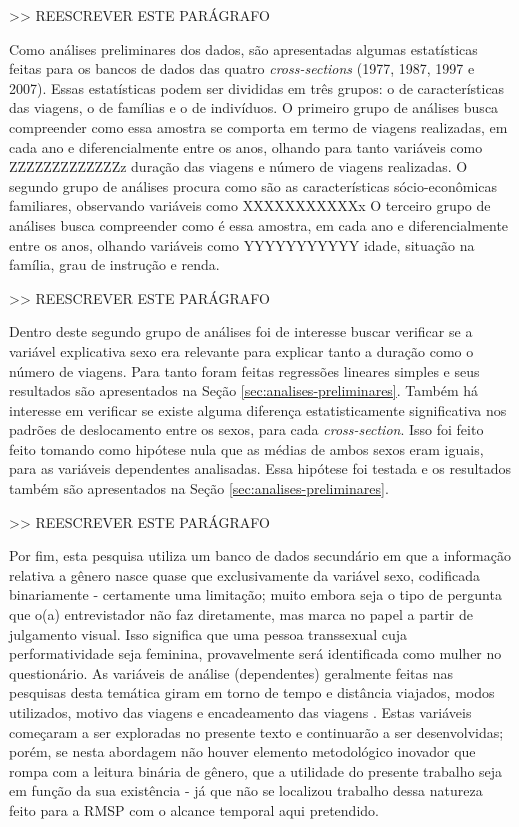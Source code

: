 >> REESCREVER ESTE PARÁGRAFO

Como análises preliminares dos dados, são apresentadas algumas estatísticas feitas para os bancos de dados das quatro \emph{cross-sections} (1977, 1987, 1997 e 2007). Essas estatísticas podem ser divididas em três grupos: o de características das viagens, o de famílias e o de indivíduos. 
O primeiro grupo de análises busca compreender como essa amostra se comporta em termo de viagens realizadas, em cada ano e diferencialmente entre os anos, olhando para tanto variáveis como 
ZZZZZZZZZZZZZz duração das viagens e número de viagens realizadas.
O segundo grupo de análises procura como são as características sócio-econômicas familiares, observando variáveis como 
XXXXXXXXXXXx
O terceiro grupo de análises busca compreender como é essa amostra, em cada ano e diferencialmente entre os anos, olhando variáveis como 
YYYYYYYYYYY idade, situação na família, grau de instrução e renda. 

>> REESCREVER ESTE PARÁGRAFO

Dentro deste segundo grupo de análises foi de interesse buscar verificar se a variável explicativa sexo era relevante para explicar tanto a duração como o número de viagens. Para tanto foram feitas regressões lineares simples e seus resultados são apresentados na Seção \ref{sec:analises-preliminares}. Também há interesse em verificar se existe alguma diferença estatisticamente significativa nos padrões de deslocamento entre os sexos, para cada \emph{cross-section}. Isso foi feito feito tomando como hipótese nula que as médias de ambos sexos eram iguais, para as variáveis dependentes analisadas. Essa hipótese foi testada e os resultados também são apresentados na Seção \ref{sec:analises-preliminares}.

>> REESCREVER ESTE PARÁGRAFO

Por fim, esta pesquisa utiliza um banco de dados secundário em que a informação relativa a gênero nasce quase que exclusivamente da variável sexo, codificada binariamente - certamente uma limitação; muito embora seja o tipo de pergunta que o(a) entrevistador não faz diretamente, mas marca no papel a partir de julgamento visual. Isso significa que uma pessoa transsexual cuja performatividade seja feminina, provavelmente será identificada como mulher no questionário. As variáveis de análise (dependentes) geralmente feitas nas pesquisas desta temática giram em torno de tempo e distância viajados, modos utilizados, motivo das viagens e encadeamento das viagens \cite{HANSON2010}. Estas variáveis começaram a ser exploradas no presente texto e continuarão a ser desenvolvidas; porém, se nesta abordagem não houver elemento metodológico inovador que rompa com a leitura binária de gênero, que a utilidade do presente trabalho seja em função da sua existência - já que não se localizou trabalho dessa natureza feito para a RMSP com o alcance temporal aqui pretendido. 

